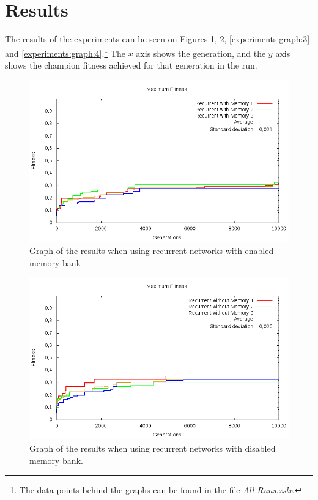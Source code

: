 
\section{Results}
The results of the experiments can be seen on Figures \ref{experiments:graph:1}, \ref{experiments:graph:2}, \ref{experiments:graph:3} and \ref{experiments:graph:4}.\footnote{The data points behind the graphs can be found in the file \textit{All Runs.xslx}.} The $x$ axis shows the generation, and the $y$ axis shows the champion fitness achieved for that generation in the run.

\begin{figure}[H]
	\includegraphics[width=\textwidth]{figures/recurrentmemory.png}
\caption{Graph of the results when using recurrent networks with enabled memory bank}
	\label{experiments:graph:1}
\end{figure}
\begin{figure}[H]
	\includegraphics[width=\textwidth]{figures/recurrentnomemory.png}
	\caption{Graph of the results when using recurrent networks with disabled memory bank.}
		\label{experiments:graph:2}
\end{figure}

